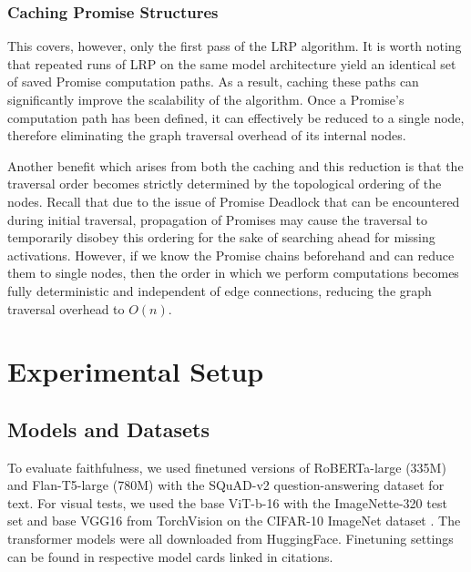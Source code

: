 \documentclass{article}
\begin{document}
\subsubsection{Caching Promise Structures}
\label{sec:promise-caching}
This covers, however, only the first pass of the LRP algorithm. It is worth noting that repeated runs of LRP on the same model architecture yield an identical set of saved Promise computation paths.
As a result, caching these paths can significantly improve the scalability of the algorithm.
Once a Promise's computation path has been defined, it can effectively be reduced to a single node, therefore eliminating the graph traversal overhead of its internal nodes.

Another benefit which arises from both the caching and this reduction is that the traversal order becomes strictly determined by the topological ordering of the nodes.
Recall that due to the issue of Promise Deadlock that can be encountered during initial traversal, propagation of Promises may cause the traversal to temporarily disobey this ordering for the sake of searching ahead for missing activations.
However, if we know the Promise chains beforehand and can reduce them to single nodes, then the order in which we perform computations becomes fully deterministic and independent of edge connections, reducing the graph traversal overhead to $O(n)$.

\section{Experimental Setup}
\label{sec:experiments}
\subsection{Models and Datasets}
To evaluate faithfulness, we used finetuned versions of RoBERTa-large (335M) \cite{liu2019roberta} and Flan-T5-large (780M) \cite{chung2022flant5}
with the SQuAD-v2 question-answering dataset \cite{rajpurkar2018squadv2, chan2021robertasquadv2, lee2023flant5squadv2} for text.
For visual tests, we used the base ViT-b-16 \cite{dosovitskiy2021vit} with the ImageNette-320 \cite{howard2019imagenette} test set and base
VGG16 \cite{simonyan2015vgg} from TorchVision on the CIFAR-10 ImageNet dataset \cite{krizhevsky2009learning}.
The transformer models were all downloaded from HuggingFace. Finetuning settings can be found in respective model cards linked in citations.
\end{document}
